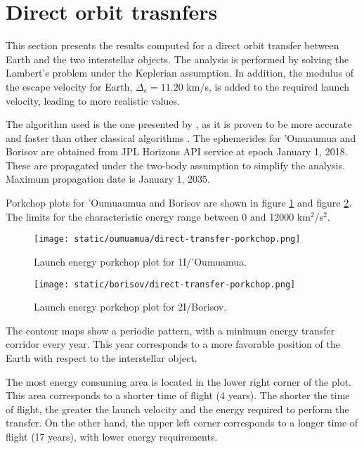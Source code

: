 \section{Direct orbit trasnfers}

This section presents the results computed for a direct orbit transfer between
Earth and the two interstellar objects. The analysis is performed by solving the
Lambert's problem under the Keplerian assumption. In addition, the modulus of
the escape velocity for Earth, $\Delta_e = 11.20$ km/s, is added to the required
launch velocity, leading to more realistic values.

The algorithm used is the one presented by \cite{izzo2015}, as it is proven to
be more accurate and faster than other classical algorithms \cite{martinez2021}.
The ephemerides for 'Omuaumua and Borisov are obtained from JPL Horizons API
service at epoch January 1, 2018. These are propagated under the two-body
assumption to simplify the analysis. Maximum propagation date is January 1,
2035.

Porkchop plots for 'Oumuaumua and Borisov are shown in figure
\ref{fig:oumuamua-direct-transfer-porkchop} and figure
\ref{fig:borisov-direct-transfer-porkchop}. The limits for the characteristic
energy range between 0 and 12000 km$^2$/s$^2$.

\begin{figure}[H]
  \centering
  \texttt{[image: static/oumuamua/direct-transfer-porkchop.png]}
  \caption{Launch energy porkchop plot for 1I/'Oumuamua.}
  \label{fig:oumuamua-direct-transfer-porkchop}
\end{figure}
\begin{figure}[H]
  \centering
  \texttt{[image: static/borisov/direct-transfer-porkchop.png]}
  \caption{Launch energy porkchop plot for 2I/Borisov.}
  \label{fig:borisov-direct-transfer-porkchop}
\end{figure}

The contour maps show a periodic pattern, with a minimum energy transfer
corridor every year. This year corresponds to a more favorable position of the
Earth with respect to the interstellar object.

The most energy consuming area is located in the lower right corner of the plot.
This area corresponds to a shorter time of flight (4 years). The shorter the time of
flight, the greater the launch velocity and the energy required to perform the
transfer. On the other hand, the upper left corner corresponds to a longer time
of flight (17 years), with lower energy requirements.

